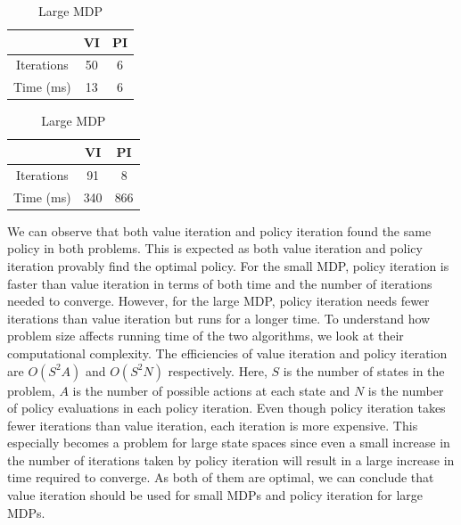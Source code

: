 \documentclass[letterpaper]{article}
\begin{document}
	\begin{table}[!htb]
		\centering
		\captionsetup{justification=centering}
		\caption{Performance of value iteration and policy iteration}
		\label{tab:performance}
		\begin{subtable}{.5\linewidth}
			\centering
			\caption{Small MDP}
			\begin{tabular}{ccc}
				\toprule
				 & \textbf{VI} & \textbf{PI} \\
				 \midrule
				 Iterations & 50 & 6 \\
				 \midrule
				 Time (ms) & 13 & 6 \\
				 \bottomrule
			\end{tabular}
		\end{subtable}%
		\begin{subtable}{.5\linewidth}
			\centering
			\caption{Large MDP}
			\begin{tabular}{ccc}
				\toprule
				& \textbf{VI} & \textbf{PI} \\
				\midrule
				Iterations & 91 & 8 \\
				\midrule
				Time (ms) & 340 & 866 \\
				\bottomrule
			\end{tabular}
		\end{subtable} 
	\end{table}

	We can observe that both value iteration and policy iteration found the same policy in both problems. This is expected as both value iteration and policy iteration provably find the optimal policy. For the small MDP, policy iteration is faster than value iteration in terms of both time and the number of iterations needed to converge. However, for the large MDP, policy iteration needs fewer iterations than value iteration but runs for a longer time. To understand how problem size affects running time of the two algorithms, we look at their computational complexity. The efficiencies of value iteration and policy iteration are $O(S^2 A)$ and $O(S^2 N)$ respectively. Here, $S$ is the number of states in the problem, $A$ is the number of possible actions at each state and $N$ is the number of policy evaluations in each policy iteration. Even though policy iteration takes fewer iterations than value iteration, each iteration is more expensive. This especially becomes a problem for large state spaces since even a small increase in the number of iterations taken by policy iteration will result in a large increase in time required to converge. As both of them are optimal, we can conclude that value iteration should be used for small MDPs and policy iteration for large MDPs.
	
\end{document}

